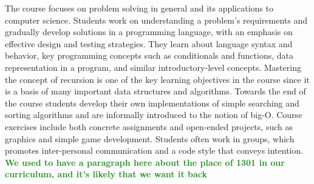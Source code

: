 \documentclass[submission,copyright,creativecommons]{eptcs}
\newcommand{\allcomments}[1]{{#1}}
\newcommand{\elenacomment}[1]{{\bf \textcolor{ForestGreen}{\allcomments{{#1}}}}}
\newcommand{\stephencomment}[1]{{\bf \color{StephensBlue}{\allcomments{{#1}}}}} %
\newcommand{\joecomment}[1]{{\bf \color{JoesGold}{\allcomments{{#1}}}}}
\begin{document}
The course focuses on problem solving in general and  its applications to computer science.
Students work on understanding a problem's requirements and gradually develop solutions in a programming language, with an emphasis on effective design and testing strategies. They learn about language syntax and behavior, key programming concepts such as conditionals and functions, data representation in a program, and similar introductory-level concepts. Mastering the concept of recursion is one of the key learning objectives in the course since it is a basis of many important data structures and algorithms. 
Towards the end of the course students develop their own implementations of simple searching and sorting algorithms and are informally introduced to the notion of big-O. Course exercises include both concrete assignments and open-ended projects, such as graphics and simple game development. Students often work in groups, which promotes inter-personal communication and a code style that conveys intention. 
\elenacomment{We used to have a paragraph here about the place of 1301 in our curriculum, and it's likely that we want it back}

\end{document}
